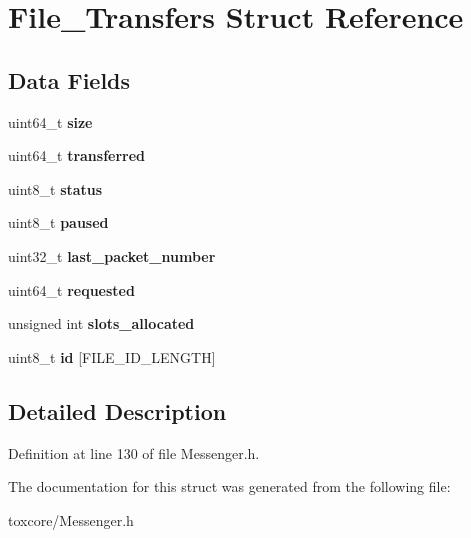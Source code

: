 \hypertarget{struct_file___transfers}{\section{File\+\_\+\+Transfers Struct Reference}
\label{struct_file___transfers}
}
\subsection*{Data Fields}
\begin{DoxyCompactItemize}
\item 
\hypertarget{struct_file___transfers_af931a8871310b4dad23f0f0b0f623560}{uint64\+\_\+t {\bfseries size}}\label{struct_file___transfers_af931a8871310b4dad23f0f0b0f623560}

\item 
\hypertarget{struct_file___transfers_ae0a9ddd27f7c6669cb964f6245b2550d}{uint64\+\_\+t {\bfseries transferred}}\label{struct_file___transfers_ae0a9ddd27f7c6669cb964f6245b2550d}

\item 
\hypertarget{struct_file___transfers_ade818037fd6c985038ff29656089758d}{uint8\+\_\+t {\bfseries status}}\label{struct_file___transfers_ade818037fd6c985038ff29656089758d}

\item 
\hypertarget{struct_file___transfers_a84bd3ab7c2cbad7fb0b6233504515973}{uint8\+\_\+t {\bfseries paused}}\label{struct_file___transfers_a84bd3ab7c2cbad7fb0b6233504515973}

\item 
\hypertarget{struct_file___transfers_a14f807289cc5523a0081c7f87aed647e}{uint32\+\_\+t {\bfseries last\+\_\+packet\+\_\+number}}\label{struct_file___transfers_a14f807289cc5523a0081c7f87aed647e}

\item 
\hypertarget{struct_file___transfers_a23cc26eca74ddec84f975c0be5496457}{uint64\+\_\+t {\bfseries requested}}\label{struct_file___transfers_a23cc26eca74ddec84f975c0be5496457}

\item 
\hypertarget{struct_file___transfers_ae5c1661a0e1ed999ed054d837989556b}{unsigned int {\bfseries slots\+\_\+allocated}}\label{struct_file___transfers_ae5c1661a0e1ed999ed054d837989556b}

\item 
\hypertarget{struct_file___transfers_aa32dbb3439461c6ccc1a52ff15bcb22e}{uint8\+\_\+t {\bfseries id} \mbox{[}F\+I\+L\+E\+\_\+\+I\+D\+\_\+\+L\+E\+N\+G\+T\+H\mbox{]}}\label{struct_file___transfers_aa32dbb3439461c6ccc1a52ff15bcb22e}

\end{DoxyCompactItemize}


\subsection{Detailed Description}


Definition at line 130 of file Messenger.\+h.



The documentation for this struct was generated from the following file\+:\begin{DoxyCompactItemize}
\item 
toxcore/Messenger.\+h\end{DoxyCompactItemize}
